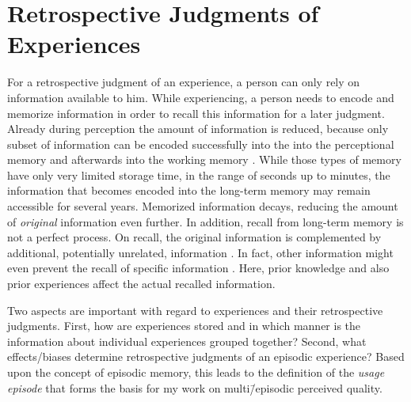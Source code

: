 \section{Retrospective Judgments of Experiences}\label{chap:03}
For a retrospective judgment of an experience, a person can only rely on information available to him.
While experiencing, a person needs to encode and memorize information in order to recall this information for a later judgment.
Already during perception the amount of information is reduced, because only subset of information can be encoded successfully into the into the perceptional memory and afterwards into the working memory \citep[][p.~8f.]{raake_speech_2006}.
While those types of memory have only very limited storage time, in the range of seconds up to minutes, the information that becomes encoded into the long-term memory may remain accessible for several years.
Memorized information decays, reducing the amount of \emph{original} information even further.
In addition, recall from long-term memory is not a perfect process.
On recall, the original information is complemented by additional, potentially unrelated, information \citep[\cf,][]{schacter_seven_2003}.
In fact, other information might even prevent the recall of specific information \citep[\cf,][]{schacter_seven_2003}.
Here, prior knowledge and also prior experiences affect the actual recalled information.

Two aspects are important with regard to experiences and their retrospective judgments.
First, how are experiences stored and in which manner is the information about individual experiences grouped together?
Second, what effects/biases determine retrospective judgments of an episodic experience?
Based upon the concept of episodic memory, this leads to the definition of the \emph{usage episode} that forms the basis for my work on multi\=/episodic perceived quality.

